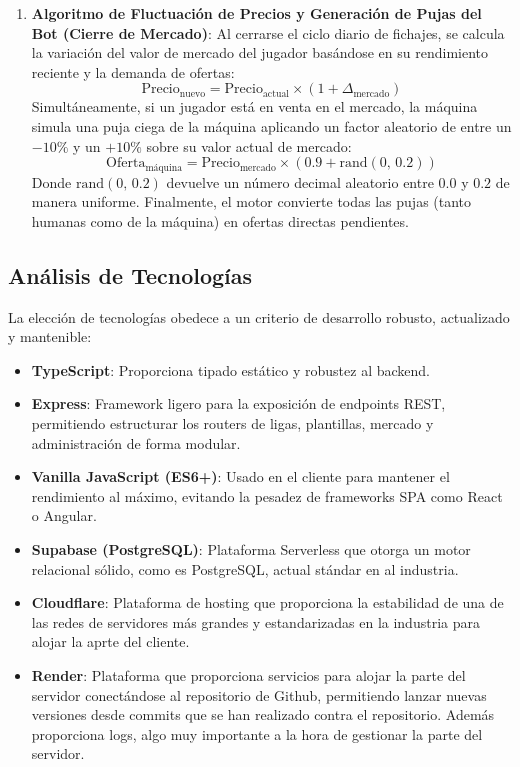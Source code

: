 \begin{enumerate}
    \item \textbf{Algoritmo de Fluctuación de Precios y Generación de Pujas del Bot (Cierre de Mercado)}:
    Al cerrarse el ciclo diario de fichajes, se calcula la variación del valor de mercado del jugador basándose en su rendimiento reciente y la demanda de ofertas:
    \[ \text{Precio}_{\text{nuevo}} = \text{Precio}_{\text{actual}} \times (1 + \Delta_{\text{mercado}}) \]
    Simultáneamente, si un jugador está en venta en el mercado, la máquina simula una puja ciega de la máquina aplicando un factor aleatorio de entre un $-10\%$ y un $+10\%$ sobre su valor actual de mercado:
    \[ \text{Oferta}_{\text{máquina}} = \text{Precio}_{\text{mercado}} \times (0.9 + \text{rand}(0, \, 0.2)) \]
    Donde $\text{rand}(0, \, 0.2)$ devuelve un número decimal aleatorio entre $0.0$ y $0.2$ de manera uniforme. Finalmente, el motor convierte todas las pujas (tanto humanas como de la máquina) en ofertas directas pendientes.
\end{enumerate}

\subsection{Análisis de Tecnologías}
La elección de tecnologías obedece a un criterio de desarrollo robusto, actualizado y mantenible:
\begin{itemize}
    \item \textbf{TypeScript}: Proporciona tipado estático y robustez al backend.
    \item \textbf{Express}: Framework ligero para la exposición de endpoints REST, permitiendo estructurar los routers de ligas, plantillas, mercado y administración de forma modular.
    \item \textbf{Vanilla JavaScript (ES6+)}: Usado en el cliente para mantener el rendimiento al máximo, evitando la pesadez de frameworks SPA como React o Angular.
    \item \textbf{Supabase (PostgreSQL)}: Plataforma Serverless que otorga un motor relacional sólido, como es PostgreSQL, actual stándar en al industria.
    \item \textbf{Cloudflare}: Plataforma de hosting que proporciona la estabilidad de una de las redes de servidores más grandes y estandarizadas en la industria para alojar la aprte del cliente.
    \item \textbf{Render}: Plataforma que proporciona servicios para alojar la parte del servidor conectándose al repositorio de Github, permitiendo lanzar nuevas versiones desde commits que se han realizado contra el repositorio. Además proporciona logs, algo muy importante a la hora de gestionar la parte del servidor.
\end{itemize}

